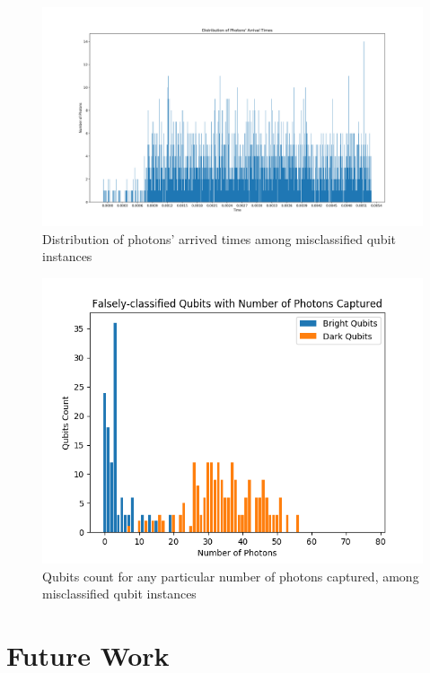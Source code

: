 \documentclass[letterpaper,twocolumn,10pt]{article}
\begin{document}
\begin{figure}[]
    \includegraphics[width=\linewidth]{Figures/misclassified_photons_distro.png}
    \centering
    \caption{Distribution of photons' arrived times among misclassified qubit instances}
    \label{fig:misclassified_photons_distro}
\end{figure}

\begin{figure}[]
    \includegraphics[width=\linewidth]{Figures/misclassified_photons_count.png}
    \centering
    \caption{Qubits count for any particular number of photons captured, among misclassified qubit instances}
    \label{fig:misclassified_photons_count}
\end{figure}

\section{Future Work}
\end{document}
